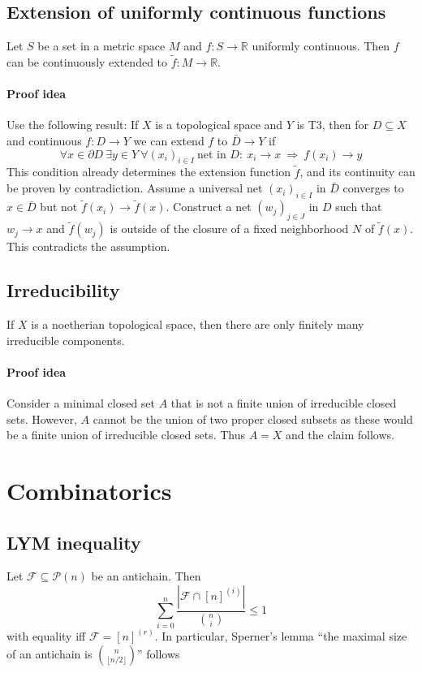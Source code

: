 \documentclass{scrartcl}
\newcommand{\R}{\mathbb{R}}
\begin{document}
\subsection{Extension of uniformly continuous functions}
Let $S$ be a set in a metric space $M$ and $f: S \to \R$ uniformly continuous. Then $f$ can be continuously extended to $\tilde{f}: M \to \R$.
\paragraph{Proof idea} Use the following result: If $X$ is a topological space and $Y$ is T3, then for $D \subseteq X$ and continuous $f: D \to Y$ we can extend $f$ to $\bar{D} \to Y$ if 
\begin{equation*}
    \forall x \in \partial D \ \exists y \in Y \ \forall (x_i)_{i \in I} \ \text{net in $D$}: \ x_i \to x \ \Rightarrow \ f(x_i) \to y
\end{equation*}
This condition already determines the extension function $\tilde{f}$, and its continuity can be proven by contradiction. Assume a universal net $(x_i)_{i \in I}$ in $\bar{D}$ converges to $x \in \bar{D}$ but not $\tilde{f}(x_i) \to \tilde{f}(x)$. Construct a net $(w_j)_{j \in J}$ in $D$ such that $w_j \to x$ and $\tilde{f}(w_j)$ is outside of the closure of a fixed neighborhood $N$ of $\tilde{f}(x)$. This contradicts the assumption.

\subsection{Irreducibility}
If $X$ is a noetherian topological space, then there are only finitely many irreducible components.
\paragraph{Proof idea} Consider a minimal closed set $A$ that is not a finite union of irreducible closed sets.
However, $A$ cannot be the union of two proper closed subsets as these would be a finite union of irreducible closed sets.
Thus $A = X$ and the claim follows.

\section{Combinatorics}

\subsection{LYM inequality}
Let $\mathcal{F} \subseteq \mathcal{P}(n)$ be an antichain. Then
\begin{equation*}
    \sum_{i = 0}^n \frac {| \mathcal{F} \cap [n]^{(i)} |} {{n \choose i}} \leq 1
\end{equation*}
with equality iff $\mathcal{F} = [n]^{(r)}$. 
In particular, Sperner's lemma ``the maximal size of an antichain is ${n \choose \lfloor n/2 \rfloor}$'' follows
\end{document}
